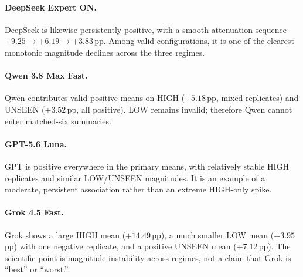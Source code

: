 \paragraph{DeepSeek Expert ON.}
DeepSeek is likewise persistently positive, with a smooth attenuation sequence $+9.25\rightarrow +6.19\rightarrow +3.83$\,pp.
Among valid configurations, it is one of the clearest monotonic magnitude declines across the three regimes.

\paragraph{Qwen 3.8 Max Fast.}
Qwen contributes valid positive means on HIGH ($+5.18$\,pp, mixed replicates) and UNSEEN ($+3.52$\,pp, all positive).
LOW remains invalid; therefore Qwen cannot enter matched-six summaries.

\paragraph{GPT-5.6 Luna.}
GPT is positive everywhere in the primary means, with relatively stable HIGH replicates and similar LOW/UNSEEN magnitudes.
It is an example of a moderate, persistent association rather than an extreme HIGH-only spike.

\paragraph{Grok 4.5 Fast.}
Grok shows a large HIGH mean ($+14.49$\,pp), a much smaller LOW mean ($+3.95$\,pp) with one negative replicate, and a positive UNSEEN mean ($+7.12$\,pp).
The scientific point is magnitude instability across regimes, not a claim that Grok is ``best'' or ``worst.''
